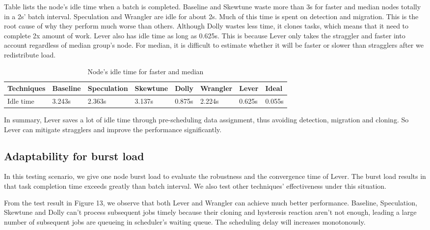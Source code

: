 \documentclass[10pt,conference,compsocconf,letterpaper]{IEEEtran}
\begin{document}
  Table \uppercase\expandafter{} lists the node's idle time when a batch is completed. Baseline and Skewtune waste more than 3s for faster and median nodes totally in a 2s' batch interval. Speculation and Wrangler are idle for about 2s. Much of this time is spent on detection and migration. This is the root cause of why they perform much worse than others. Although Dolly wastes less time, it clones tasks, which means that it need to complete 2x amount of work. Lever also has idle time as long as 0.625s. This is because Lever only takes the straggler and faster into account regardless of median group's node. For median, it is difficult to estimate whether it will be faster or slower than stragglers after we redistribute load.
  \begin{table}[htbp]
    \small
    \centering
    \caption{Node's idle time for faster and median}
    \begin{threeparttable}
    \centering
      \begin{tabular}{|p{1.4cm}|p{1.2cm}|p{1.5cm}|p{1.2cm}|p{0.9cm}|p{1.2cm}|p{0.9cm}|p{0.9cm}|}
        \hline
        Techniques & Baseline & Speculation & Skewtune & Dolly & Wrangler & Lever & Ideal \\
        \hline
        Idle time & 3.243s & 2.363s & 3.137s & 0.875s & 2.224s & 0.625s & 0.055s \\
        \hline
      \end{tabular}
    \end{threeparttable}
    \label{Table3}
  \end{table}

  In summary, Lever saves a lot of idle time through pre-scheduling data assignment, thus avoiding detection, migration and cloning. So Lever can mitigate stragglers and improve the performance significantly.

\subsection{Adaptability for burst load}

  In this testing scenario, we give one node burst load to evaluate the robustness and the convergence time of Lever. The burst load results in that task completion time exceeds greatly than batch interval. We also test other techniques' effectiveness under this situation.

  From the test result in Figure 13, we observe that both Lever and Wrangler can achieve much better performance. Baseline, Speculation, Skewtune and Dolly can't process subsequent jobs timely because their cloning and hysteresis reaction aren't not enough, leading a large number of subsequent jobs are queueing in scheduler's waiting queue. The scheduling delay will increases monotonously.
\end{document}
